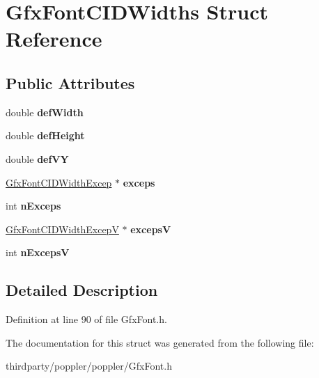 \hypertarget{struct_gfx_font_c_i_d_widths}{}\section{Gfx\+Font\+C\+I\+D\+Widths Struct Reference}
\label{struct_gfx_font_c_i_d_widths}
\subsection*{Public Attributes}
\begin{DoxyCompactItemize}
\item 
\mbox{\label{struct_gfx_font_c_i_d_widths_a6cbdd07e93b1af8aad54d95af6fa0c6a}} 
double {\bfseries def\+Width}
\item 
\mbox{\label{struct_gfx_font_c_i_d_widths_a9e0a881c227bdca4cd58503463739dbb}} 
double {\bfseries def\+Height}
\item 
\mbox{\label{struct_gfx_font_c_i_d_widths_a2bee7a9bf10e9ef869f660f37f6c18e5}} 
double {\bfseries def\+VY}
\item 
\mbox{\label{struct_gfx_font_c_i_d_widths_a79f91827ea6e34d1d50bd3791ef7199a}} 
\hyperlink{struct_gfx_font_c_i_d_width_excep}{Gfx\+Font\+C\+I\+D\+Width\+Excep} $\ast$ {\bfseries exceps}
\item 
\mbox{\label{struct_gfx_font_c_i_d_widths_a055b5e6107275a1830649dde2e6e2e9d}} 
int {\bfseries n\+Exceps}
\item 
\mbox{\label{struct_gfx_font_c_i_d_widths_a8934ec4996b01d1d6bd24a85b7923ede}} 
\hyperlink{struct_gfx_font_c_i_d_width_excep_v}{Gfx\+Font\+C\+I\+D\+Width\+ExcepV} $\ast$ {\bfseries excepsV}
\item 
\mbox{\label{struct_gfx_font_c_i_d_widths_ade7b2956646448964886fa1c94c5c610}} 
int {\bfseries n\+ExcepsV}
\end{DoxyCompactItemize}


\subsection{Detailed Description}


Definition at line 90 of file Gfx\+Font.\+h.



The documentation for this struct was generated from the following file\+:\begin{DoxyCompactItemize}
\item 
thirdparty/poppler/poppler/Gfx\+Font.\+h\end{DoxyCompactItemize}

